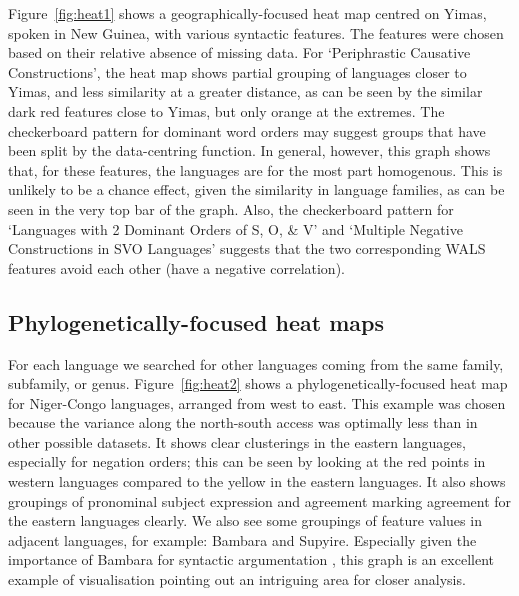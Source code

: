 \documentclass[11pt]{article}
\begin{document}
Figure~\ref{fig:heat1} shows a geographically-focused heat map centred on Yimas, spoken in New Guinea, with various syntactic features. The features were chosen based on their relative absence of missing data. For `Periphrastic Causative Constructions', the heat map shows partial grouping of languages closer to Yimas, and less similarity at a greater distance, as can be seen by the similar dark red features close to Yimas, but only orange at the extremes. The checkerboard pattern for dominant word orders may suggest groups that have been split by the data-centring function. In general, however, this graph shows that, for these features, the languages are for the most part homogenous. This is unlikely to be a chance effect, given the similarity in language families, as can be seen in the very top bar of the graph. Also, the checkerboard pattern for `Languages with 2 Dominant Orders of S, O, \& V' and `Multiple Negative Constructions in SVO Languages' suggests that the two corresponding WALS features avoid each other (have a negative correlation). 

\subsection{Phylogenetically-focused heat maps}

For each language we searched for other languages coming from the same family, subfamily, or genus. Figure~\ref{fig:heat2} shows a phylogenetically-focused heat map for Niger-Congo languages, arranged from west to east. This example was chosen because the variance along the north-south access was optimally less than in other possible datasets. %
It shows clear clusterings in the eastern languages, especially for negation orders; this can be seen by looking at the red points in western languages compared to the yellow in the eastern languages. It also shows groupings of pronominal subject expression and agreement marking agreement for the eastern languages clearly. We also see some groupings of feature values in adjacent languages, for example: Bambara and Supyire. Especially given the importance of Bambara for syntactic argumentation \cite{culy}, this graph is an excellent example of visualisation pointing out an intriguing area for closer analysis.

\end{document}
